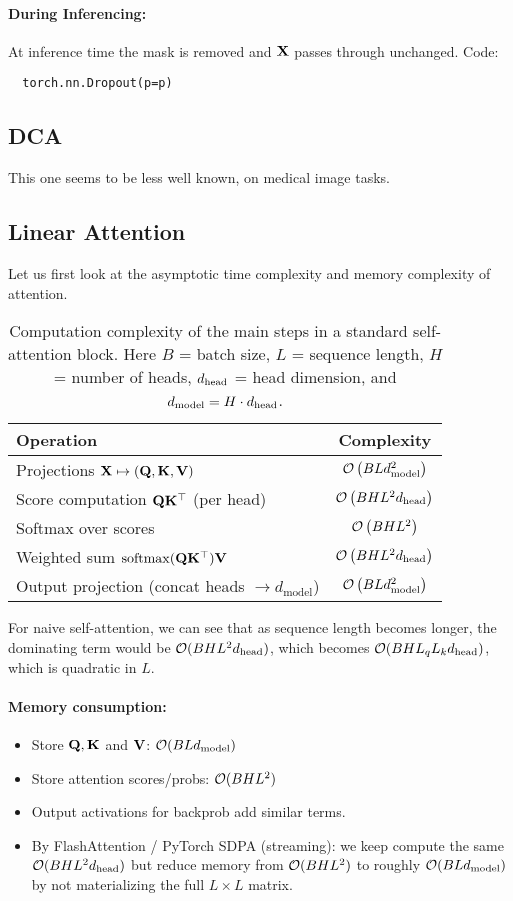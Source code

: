\documentclass[11pt]{article}  %
\begin{document}
\paragraph{During Inferencing:}
At inference time the mask is removed and $\mathbf{X}$ passes through unchanged. Code: 
\begin{verbatim}
  torch.nn.Dropout(p=p)
\end{verbatim}

\subsection{DCA}
This one seems to be less well known, on medical image tasks.

\subsection{Linear Attention}
Let us first look at the asymptotic time complexity and memory complexity of attention.
\begin{table}[H]
\label{table1}
\centering
\renewcommand{\arraystretch}{1.2}
\begin{tabular}{@{}l c@{}}
\toprule
\textbf{Operation} & \textbf{Complexity} \\
\midrule
Projections $\mathbf{X} \mapsto (\mathbf{Q},\mathbf{K},\mathbf{V})$ & $\mathcal{O}\left(BLd_{\text{model}}^{2}\right)$ \\
Score computation $\mathbf{Q}\mathbf{K}^{\top}$ (per head) & $\mathcal{O}\left(BHL^{2}d_{\text{head}}\right)$ \\
Softmax over scores & $\mathcal{O}\left(BHL^{2}\right)$ \\
Weighted sum $\mathrm{softmax}(\mathbf{Q}\mathbf{K}^{\top})\mathbf{V}$ & $\mathcal{O}\left(BHL^{2}d_{\text{head}}\right)$ \\
Output projection (concat heads $\to d_{\text{model}}$) & $\mathcal{O}\left(BLd_{\text{model}}^{2}\right)$ \\
\bottomrule
\end{tabular}
\caption{Computation complexity of the main steps in a standard self-attention block. 
Here $B$ = batch size, $L$ = sequence length, $H$ = number of heads, $d_{\text{head}}$ = head dimension, and $d_{\text{model}} = H \cdot d_{\text{head}}$.}
\end{table}
For naive self-attention, we can see that as sequence length becomes longer, the dominating term would be $\mathcal{O}(BHL^2d_{\text{head}})$, which becomes $\mathcal{O}(BHL_qL_kd_{\text{head}})$, which is quadratic in $L$.

\paragraph{Memory consumption:} 
\begin{itemize}
  \item Store $\mathbf{Q}, \mathbf{K}$ and $\mathbf{V}$: $\mathcal{O}(BLd_{\text{model}})$
  \item Store attention scores/probs: $\mathcal{O}(BHL^2)$
  \item Output activations for backprob add similar terms.
  \item By FlashAttention / PyTorch SDPA (streaming): we keep compute the same $\mathcal{O}(BHL^2d_{\text{head}})$ but reduce memory from $\mathcal{O}(BHL^2)$ to roughly $\mathcal{O}(BLd_{\text{model}})$ by not materializing the full $L \times L$ matrix. 
\end{itemize}
\end{document}
